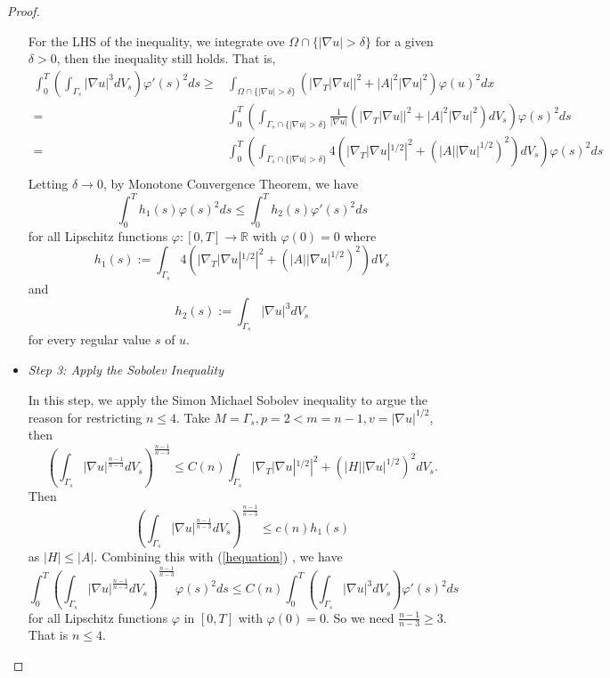 \documentclass[paper=a4, fontsize=11pt]{scrartcl} %
\numberwithin{equation}{section} %
\numberwithin{figure}{section} %
\numberwithin{table}{section} %
\numberwithin{exercise}{section}
\begin{document}
\begin{proof}
\begin{itemize}
For the LHS of the inequality, we integrate ove $\Omega\cap\{|\nabla u|>\delta \}$ for a given $\delta >0$, then the inequality still holds. That is,\
\begin{align*}
\int_{0}^T \left( \int_{\Gamma_s} |\nabla u|^3 dV_s \right) \varphi'(s)^2 ds \geq & \int_{\Omega\cap\{|\nabla u|>\delta \}} \left( |\nabla_{T}|\nabla u||^2+|A|^2|\nabla u|^2 \right) \varphi(u)^2 dx\\
{}=&\int_{0}^T \left(\int_{\Gamma_s\cap\{|\nabla u|>\delta\}} \frac{1}{|\nabla u|} \left( |\nabla_{T}|\nabla u||^2+|A|^2|\nabla u|^2 \right) dV_s \right) \varphi(s)^2 ds\\
{}=&\int_{0}^T \left(\int_{\Gamma_s\cap\{|\nabla u|>\delta\} } 4\left( |\nabla_{T}|\nabla u|^{1/2}|^2+(|A||\nabla u|^{1/2})^2 \right) dV_s \right) \varphi(s)^2 ds\\
\end{align*}
Letting $\delta\to 0$, by Monotone Convergence Theorem, we have 
\begin{equation}\label{hequation}
\int_{0}^T h_1(s) \varphi(s)^2 ds \leq \int_{0}^T h_2(s) \varphi'(s)^2 ds
\end{equation}
for all Lipschitz functions $\varphi\colon [0,T]\to \mathbb{R}$ with $\varphi(0)=0$ 
where 
$$h_1(s):=\int_{\Gamma_s}4\left( |\nabla_{T}|\nabla u|^{1/2}|^2+(|A||\nabla u|^{1/2})^2 \right) dV_s $$
and 
$$h_2(s):=\int_{\Gamma_s} |\nabla u|^3 dV_s$$
for every regular value  $s$ of $u$.


\item \emph{Step 3: Apply the Sobolev Inequality}


In this step, we apply the Simon Michael Sobolev inequality to argue the reason for restricting $n\leq 4.$
Take $M=\Gamma_s, p=2 <m =n-1,  v=|\nabla u|^{1/2}$, then 
$$\left(\int_{\Gamma_s} |\nabla u|^{\frac{n-1}{n-3}} dV_s \right) ^{\frac{n-1}{n-3}}\leq C(n)\int_{\Gamma_s}|\nabla_{T}|\nabla u|^{1/2}|^2+(|H||\nabla u|^{1/2})^2 dV_s.$$
Then 
\begin{equation}\label{h1}
\left(\int_{\Gamma_s} |\nabla u|^{\frac{n-1}{n-3}} dV_s \right) ^{\frac{n-1}{n-3}}\leq c(n) h_1(s)
\end{equation}
as $|H|\leq |A|$.
Combining this with (\ref{hequation}) , we have 
\begin{equation}
\int_{0}^T \left(\int_{\Gamma_s} |\nabla u|^{\frac{n-1}{n-3}} dV_s \right) ^{\frac{n-1}{n-3}} \varphi(s)^2 ds \leq C(n) \int_{0}^T \left( \int_{\Gamma_s} |\nabla u|^3 dV_s \right) \varphi'(s)^2 ds
\end{equation}
for all Lipschitz functions $\varphi$ in $[0,T]$ with $\varphi(0)=0.$ So we need $\frac{n-1}{n-3}\geq 3.$ That is $n\leq 4.$


\end{itemize}
\end{proof}
\end{document}
